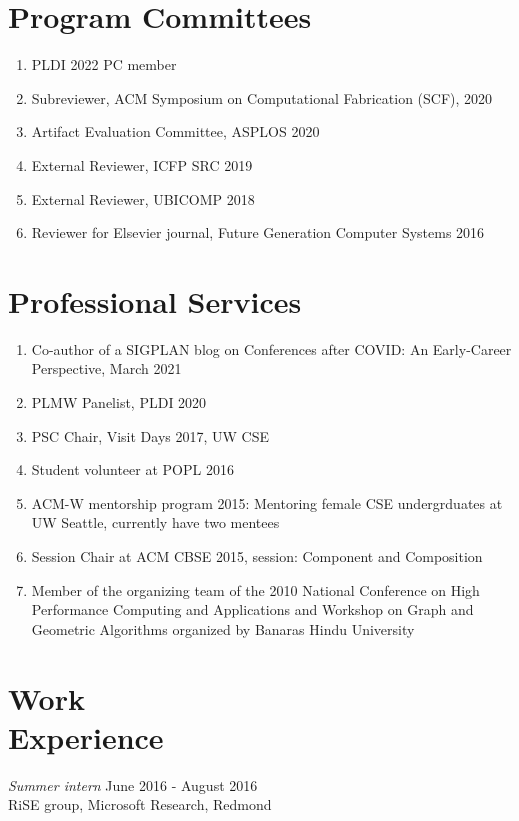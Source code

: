 \documentclass[margin, 10pt]{res} %
\begin{document}
\begin{resume}
\section{Program Committees}
\begin{enumerate}[itemsep=-2pt]
\item PLDI 2022 PC member
\item Subreviewer, ACM Symposium on Computational Fabrication (SCF), 2020
\item Artifact Evaluation Committee, ASPLOS 2020
\item External Reviewer, ICFP SRC 2019
\item External Reviewer, UBICOMP 2018
\item Reviewer for Elsevier journal, Future Generation Computer Systems 2016
\end{enumerate}

\section{Professional Services}
\begin{enumerate}[itemsep=-2pt]
\item Co-author of a SIGPLAN blog on Conferences after COVID: An Early-Career Perspective, March 2021
\item PLMW Panelist, PLDI 2020
\item PSC Chair, Visit Days 2017, UW CSE
\item Student volunteer at POPL 2016
\item ACM-W mentorship program 2015: Mentoring female CSE undergrduates at UW Seattle, currently have two mentees
\item Session Chair at ACM CBSE 2015, session: Component and Composition
\item Member of the organizing team of the 2010 National Conference on High
  Performance Computing and Applications and Workshop on Graph and
  Geometric Algorithms organized by Banaras Hindu University
\end{enumerate}

\section{Work \\ Experience}
{\sl Summer intern} \hfill June 2016 - August 2016 \\
RiSE group, Microsoft Research, Redmond


\end{resume}
\end{document}
